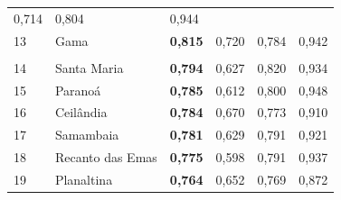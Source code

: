 \begin{table}[]
\begin{tabular}{llllll}
        {\color[HTML]{202122} 0,714} &
        {\color[HTML]{202122} 0,804} &
        {\color[HTML]{202122} 0,944} \\
        \rowcolor[HTML]{F8F9FA}
        {\color[HTML]{202122} 13} &
        {\color[HTML]{0B0080} Gama} &
        {\color[HTML]{202122} \textbf{0,815}} &
        {\color[HTML]{202122} 0,720} &
        {\color[HTML]{202122} 0,784} &
        {\color[HTML]{202122} 0,942} \\
        \rowcolor[HTML]{EAECF0}
        \cellcolor[HTML]{000074}{\color[HTML]{009900} \textbf{}} &
        \multicolumn{5}{l}{\cellcolor[HTML]{EAECF0}{\color[HTML]{000074} \textbf{IDH-M alto}}} \\
        \rowcolor[HTML]{F8F9FA}
        {\color[HTML]{202122} 14} &
        {\color[HTML]{0B0080} Santa Maria} &
        {\color[HTML]{202122} \textbf{0,794}} &
        {\color[HTML]{202122} 0,627} &
        {\color[HTML]{202122} 0,820} &
        {\color[HTML]{202122} 0,934} \\
        \rowcolor[HTML]{F8F9FA}
        {\color[HTML]{202122} 15} &
        {\color[HTML]{0B0080} Paranoá} &
        {\color[HTML]{202122} \textbf{0,785}} &
        {\color[HTML]{202122} 0,612} &
        {\color[HTML]{202122} 0,800} &
        {\color[HTML]{202122} 0,948} \\
        \rowcolor[HTML]{F8F9FA}
        {\color[HTML]{202122} 16} &
        {\color[HTML]{0B0080} Ceilândia} &
        {\color[HTML]{202122} \textbf{0,784}} &
        {\color[HTML]{202122} 0,670} &
        {\color[HTML]{202122} 0,773} &
        {\color[HTML]{202122} 0,910} \\
        \rowcolor[HTML]{F8F9FA}
        {\color[HTML]{202122} 17} &
        {\color[HTML]{0B0080} Samambaia} &
        {\color[HTML]{202122} \textbf{0,781}} &
        {\color[HTML]{202122} 0,629} &
        {\color[HTML]{202122} 0,791} &
        {\color[HTML]{202122} 0,921} \\
        \rowcolor[HTML]{F8F9FA}
        {\color[HTML]{202122} 18} &
        {\color[HTML]{0B0080} Recanto das Emas} &
        {\color[HTML]{202122} \textbf{0,775}} &
        {\color[HTML]{202122} 0,598} &
        {\color[HTML]{202122} 0,791} &
        {\color[HTML]{202122} 0,937} \\
        \rowcolor[HTML]{F8F9FA}
        {\color[HTML]{202122} 19} &
        {\color[HTML]{0B0080} Planaltina} &
        {\color[HTML]{202122} \textbf{0,764}} &
        {\color[HTML]{202122} 0,652} &
        {\color[HTML]{202122} 0,769} &
        {\color[HTML]{202122} 0,872} \\

\end{tabular}
\end{table}
